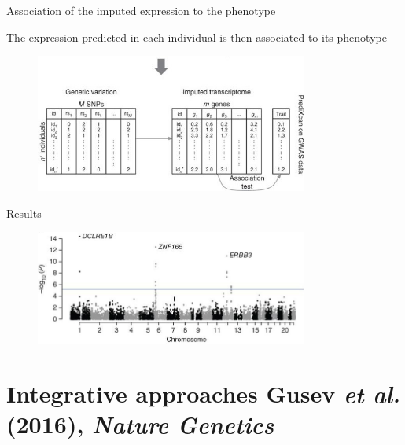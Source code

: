 \documentclass[aspectratio=169,12pt]{beamer}
\newcommand{\etal}{\textit{et al.}\xspace}
\begin{document}
\begin{frame}{Association of the imputed expression to the phenotype}

	The expression predicted in each individual is then associated to 
its phenotype
	
	\begin{figure}
		\includegraphics[width=0.8\textwidth]{gamazon2015/2-grex_estimation_part2}
	\end{figure}


\end{frame}

\begin{frame}{Results}

	\begin{figure}
		\includegraphics[width=0.8\textwidth]{gamazon2015/7-t1d_associations_manhattan}
	\end{figure}


\end{frame}

\section{Integrative approaches \newline
\scriptsize Gusev \etal (2016), \textit{Nature Genetics}}
\end{document}
